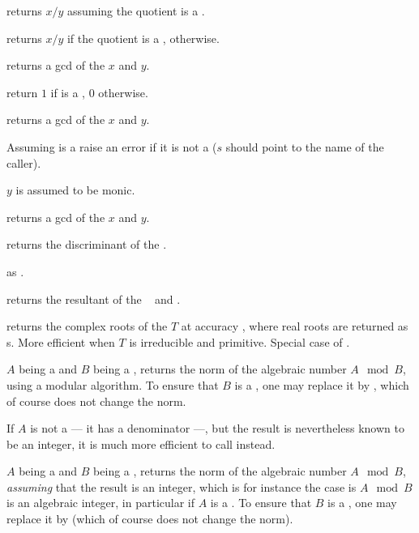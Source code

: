  returns $x/y$ assuming the quotient is a .

 returns $x/y$ if the quotient is a
,  otherwise.

 returns a gcd of the  $x$ and $y$.

 return $1$ if  is a , $0$ otherwise.

 returns a gcd of the  $x$ and $y$.


 Assuming  is a 
raise an error if it is not a  ($s$ should point to the name of the
caller).



 $y$ is assumed to be monic.

 returns a gcd of the  $x$ and $y$.

 returns the discriminant of the 
.

 as .

 returns the resultant of the
~ and .

 returns the complex roots of the
 $T$ at accuracy , where real roots are returned as
s. More efficient when $T$ is irreducible and primitive. Special
case of .


 $A$ being a  and $B$ being a
, returns the norm of the algebraic number $A \mod B$, using a
modular algorithm. To ensure that $B$ is a , one may replace it by
, which of course does not change the norm.

If $A$ is not a  --- it has a denominator ---, but the result is
nevertheless known to be an integer, it is much more efficient to call
 instead.

 $A$ being a  and $B$
being a , returns the norm of the algebraic number $A \mod B$,
\emph{assuming} that the result is an integer, which is for instance the case
is $A\mod B$ is an algebraic integer, in particular if $A$ is a . To
ensure that $B$ is a , one may replace it by 
(which of course does not change the norm).

